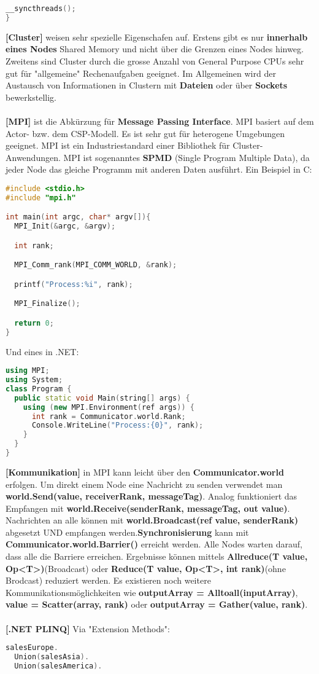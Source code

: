 \documentclass[8pt]{extarticle}
\let\oldtextbf\textbf
\renewcommand{\textbf}{\tiny\oldtextbf}
\begin{document}
\begin{multicols*}{5}
\begin{lstlisting}[language=c]
  __syncthreads();
}
\end{lstlisting}
\textbf{[Cluster]} weisen sehr spezielle Eigenschafen auf. Erstens gibt es nur \textbf{innerhalb eines Nodes} Shared Memory und nicht über die Grenzen eines Nodes hinweg. Zweitens sind Cluster durch die grosse Anzahl von General Purpose CPUs sehr gut für "allgemeine" Rechenaufgaben geeignet. Im Allgemeinen wird der Austausch von Informationen in Clustern mit \textbf{Dateien} oder über \textbf{Sockets} bewerkstellig.\\\\
\textbf{[MPI]} ist die Abkürzung für \textbf{Message Passing Interface}. MPI basiert auf dem Actor- bzw. dem CSP-Modell. Es ist sehr gut für heterogene Umgebungen geeignet. MPI ist ein Industriestandard einer Bibliothek für Cluster-Anwendungen. MPI ist sogenanntes \textbf{SPMD} (Single Program Multiple Data), da jeder Node das gleiche Programm mit anderen Daten ausführt. Ein Beispiel in C:
\begin{lstlisting}[language=c]
#include <stdio.h>
#include "mpi.h"

int main(int argc, char* argv[]){
  MPI_Init(&argc, &argv);

  int rank;

  MPI_Comm_rank(MPI_COMM_WORLD, &rank);

  printf("Process:%i", rank);

  MPI_Finalize();

  return 0;
}
\end{lstlisting}
Und eines in .NET:
\begin{lstlisting}[language=c++]
using MPI;
using System;
class Program {
  public static void Main(string[] args) {
    using (new MPI.Environment(ref args)) {
      int rank = Communicator.world.Rank;
      Console.WriteLine("Process:{0}", rank);
    }
  }
}
\end{lstlisting}
\textbf{[Kommunikation]} in MPI kann leicht über den \textbf{Communicator.world} erfolgen. Um direkt einem Node eine Nachricht zu senden verwendet man \textbf{world.Send(value, receiverRank, messageTag)}. Analog funktioniert das Empfangen mit \textbf{world.Receive(senderRank, messageTag, out value)}. Nachrichten an alle können mit \textbf{world.Broadcast(ref value, senderRank)} abgesetzt UND empfangen werden.\textbf{Synchronisierung} kann mit \textbf{Communicator.world.Barrier()} erreicht werden. Alle Nodes warten darauf, dass alle die Barriere erreichen. Ergebnisse können mittels \textbf{Allreduce(T value, Op<T>)}(Broadcast) oder \textbf{Reduce(T value, Op<T>, int rank)}(ohne Brodcast) reduziert werden. Es existieren noch weitere Kommunikationsmöglichkeiten wie \textbf{outputArray = Alltoall(inputArray)}, \textbf{value = Scatter(array, rank)} oder \textbf{outputArray = Gather(value, rank)}.\\\\
\textbf{[.NET PLINQ]} Via "Extension Methods":
\begin{lstlisting}[language=c++]
salesEurope.
  Union(salesAsia).
  Union(salesAmerica).


\end{lstlisting}
\end{multicols*}
\end{document}
